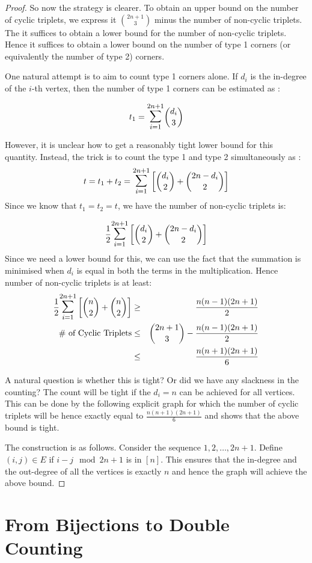 \begin{proof}
So now the strategy is clearer. To obtain an upper bound on the number of cyclic triplets, we express it ${2n+1 \choose 3}$ minus the number of non-cyclic triplets. The it suffices to obtain a lower bound for the number of non-cyclic triplets. Hence it suffices to obtain a lower bound on the number of type 1 corners (or equivalently the number of type 2) corners.

One natural attempt is to aim to count type 1 corners alone. If $d_i$ is the in-degree of the $i$-th vertex, then the number of type 1 corners can be estimated as :

$$t_1 = \bigsum_{i=1}^{2n+1} {d_i \choose 3}$$

However, it is unclear how to get a reasonably tight lower bound for this quantity. 
Instead, the trick is to count the type 1 and type 2 simultaneously as :
$$t = t_1 + t_2 = \bigsum_{i=1}^{2n+1} \left[ {d_i \choose 2}+ {2n-d_i \choose 2} \right] $$
Since we know that $t_1 = t_2 = t$, we have the number of non-cyclic triplets is:

$$\frac{1}{2}\bigsum_{i=1}^{2n+1} \left[ {d_i \choose 2}+{2n-d_i \choose 2} \right] $$
Since we need a lower bound for this, we can use the fact that the summation is minimised when $d_i$ is equal in both the terms in the multiplication. Hence number of non-cyclic triplets is at least:
\begin{eqnarray*}
\frac{1}{2}\bigsum_{i=1}^{2n+1} \left[ {n \choose 2}+{n \choose 2} \right] & \ge & \frac{n(n-1)(2n+1)}{2} \\
\textrm{\# of Cyclic Triplets} & \le & {2n+1 \choose 3}  - \frac{n(n-1)(2n+1)}{2} \\
& \le & \frac{n(n+1)(2n+1)}{6}
\end{eqnarray*}

A natural question is whether this is tight? Or did we have any slackness in the counting? The count will be tight if the $d_i = n$ can be achieved for all vertices. This can be done by the following explicit graph for which the number of cyclic triplets will be hence exactly equal to $\frac{n(n+1)(2n+1)}{6}$ and shows that the above bound is tight.

The construction is as follows. Consider the sequence $1, 2, \ldots ,2n+1$. Define $(i,j) \in E$ if $i-j \mod 2n+1$ is in $[n]$. This ensures that the in-degree and the out-degree of all the vertices is exactly $n$ and hence the graph will achieve the above bound.
\end{proof}

\section{From Bijections to Double Counting}

